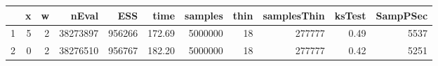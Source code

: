 \begin{table}[h]
\centering
\begingroup\tiny
\begin{tabular}{rrrrrrrrrrr}
  \hline
 & x & w & nEval & ESS & time & samples & thin & samplesThin & ksTest & SampPSec \\ 
  \hline
1 & 5 & 2 & 38273897 & 956266 & 172.69 & 5000000 & 18 & 277777 & 0.49 & 5537 \\ 
   \hline
2 & 0 & 2 & 38276510 & 956767 & 182.20 & 5000000 & 18 & 277777 & 0.42 & 5251 \\ 
   \hline
\end{tabular}
\endgroup
\end{table}
